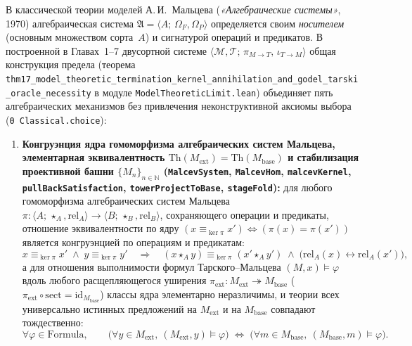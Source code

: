 В классической теории моделей А.\,И.~Мальцева (\emph{«Алгебраические системы»}, 1970) алгебраическая система $\mathfrak{A} = \langle A;\,\Omega_F,\Omega_P\rangle$ определяется своим \emph{носителем} (основным множеством сорта~$A$) и сигнатурой операций и предикатов. В построенной в Главах~1--7 двусортной системе $\langle\mathcal{M},\mathcal{T};\,\pi_{M\to T},\,\iota_{T\to M}\rangle$ общая конструкция предела (теорема \texttt{thm17\_\allowbreak model\_\allowbreak theoretic\_\allowbreak termination\_\allowbreak kernel\_\allowbreak annihilation\_\allowbreak and\_\allowbreak godel\_\allowbreak tarski\_\allowbreak oracle\_\allowbreak necessity} в модуле \texttt{ModelTheoreticLimit.lean}) объединяет пять алгебраических механизмов без привлечения неконструктивной аксиомы выбора (\texttt{0 Classical.choice}):
\begin{enumerate}[label=\textbf{\arabic*.},leftmargin=*]
\item \textbf{Конгруэнция ядра гомоморфизма алгебраических систем Мальцева, элементарная эквивалентность $\mathrm{Th}(M_{\mathrm{ext}}) = \mathrm{Th}(M_{\mathrm{base}})$ и стабилизация проективной башни $\{M_n\}_{n\in\mathbb{N}}$ (\texttt{MalcevSystem}, \texttt{MalcevHom}, \texttt{malcevKernel}, \texttt{pullBackSatisfaction}, \texttt{towerProjectToBase}, \texttt{stageFold}):}
  для любого гомоморфизма алгебраических систем Мальцева $\pi : \langle A;\,\star_A,\mathrm{rel}_A\rangle \to \langle B;\,\star_B,\mathrm{rel}_B\rangle$, сохраняющего операции и предикаты, отношение эквивалентности по ядру $(x \equiv_{\ker\pi} x') \iff (\pi(x) = \pi(x'))$ является конгруэнцией по операциям и предикатам:
  \begin{equation}
    \label{eq:mono-malcev-congruence}
    x \equiv_{\ker\pi} x' \;\land\; y \equiv_{\ker\pi} y' \quad\Longrightarrow\quad (x \star_A y) \equiv_{\ker\pi} (x' \star_A y') \;\land\; \bigl(\mathrm{rel}_A(x) \leftrightarrow \mathrm{rel}_A(x')\bigr),
  \end{equation}
  а для отношения выполнимости формул Тарского--Мальцева $(M, x) \models \varphi$ вдоль любого расщепляющегося уширения $\pi_{\mathrm{ext}} : M_{\mathrm{ext}} \twoheadrightarrow M_{\mathrm{base}}$ ($\pi_{\mathrm{ext}}\circ\mathrm{sect} = \mathrm{id}_{M_{\mathrm{base}}}$) классы ядра элементарно неразличимы, и теории всех универсально истинных предложений на $M_{\mathrm{ext}}$ и на $M_{\mathrm{base}}$ совпадают тождественно:
  \begin{equation}
    \label{eq:mono-elementary-equivalence}
    \forall\varphi \in \mathrm{Formula}, \qquad \bigl(\forall y \in M_{\mathrm{ext}},\ (M_{\mathrm{ext}}, y) \models \varphi\bigr) \;\Longleftrightarrow\; \bigl(\forall m \in M_{\mathrm{base}},\ (M_{\mathrm{base}}, m) \models \varphi\bigr).

\end{equation}
\end{enumerate}
